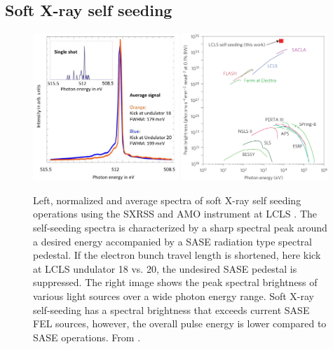 \subsection{Soft X-ray self seeding}
\begin{figure}
	\centering
		\includegraphics[width=0.49\textwidth]{images/Soft-X-ray-self-seeding.jpg}
		\includegraphics[width=0.49\textwidth]{images/spectral-brightness-fletcher-2015.jpg}
	\caption[Spectra for Soft X-ray self-seeding and spectral brightness of various lightsources.]{Left, normalized and average spectra of soft X-ray self seeding operations using the SXRSS and AMO instrument at LCLS \cite{Bucher-2014-Unpublished}. The self-seeding spectra is characterized by a sharp spectral peak around a desired energy accompanied by a SASE radiation type spectral pedestal. If the electron bunch travel length is shortened, here kick at LCLS undulator 18 vs. 20, the undesired SASE pedestal is suppressed. The right image shows the peak spectral brightness of various light sources over a wide photon energy range. Soft X-ray self-seeding has a spectral brightness that exceeds current SASE FEL sources, however, the overall pulse energy is lower compared to SASE operations. From \citep{Fletcher-2015-NatPho}.}
	\label{fig:soft-xray-self-seeding}
\end{figure}
